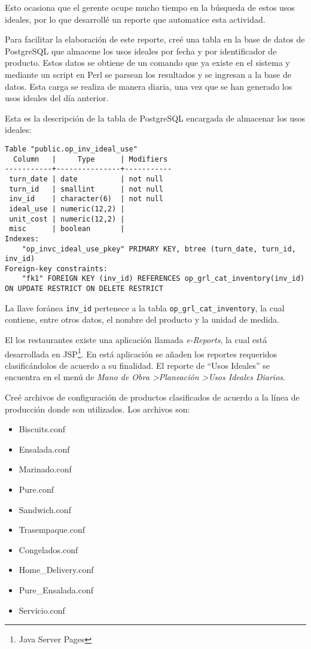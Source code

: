 Esto ocasiona que el gerente ocupe mucho tiempo en la búsqueda de estos usos ideales, por lo que desarrollé un reporte que automatice esta actividad.

Para facilitar la elaboración de este reporte, creé una tabla en la base de datos de PostgreSQL que almacene los usos ideales por fecha y por identificador de producto. Estos datos se obtiene de un comando que ya existe en el sistema y mediante un script en Perl se parsean los resultados y se ingresan a la base de datos. Esta carga se realiza de manera diaria, una vez que se han generado los usos ideales del día anterior. 

Esta es la descripción de la tabla de PostgreSQL encargada de almacenar los usos ideales:

\begin{Verbatim}[fontsize=\tiny]
    Table "public.op_inv_ideal_use"
  Column   |     Type      | Modifiers 
-----------+---------------+-----------
 turn_date | date          | not null
 turn_id   | smallint      | not null
 inv_id    | character(6)  | not null
 ideal_use | numeric(12,2) | 
 unit_cost | numeric(12,2) | 
 misc      | boolean       | 
Indexes:
    "op_invc_ideal_use_pkey" PRIMARY KEY, btree (turn_date, turn_id, inv_id)
Foreign-key constraints:
    "fk1" FOREIGN KEY (inv_id) REFERENCES op_grl_cat_inventory(inv_id) ON UPDATE RESTRICT ON DELETE RESTRICT
\end{Verbatim}

La llave foránea \texttt{inv\_id} pertenece a la tabla \texttt{op\_grl\_cat\_inventory}, la cual contiene, entre otros datos, el nombre del producto y la unidad de medida.

El los restaurantes existe una aplicación llamada \textit{e-Reports}\pageref{sec:ereports}, la cual está desarrollada en JSP\footnote{Java Server Pages}. En está aplicación se añaden los reportes requeridos clasificándolos de acuerdo a su finalidad. El reporte de ``Usos Ideales'' se  encuentra en el menú de \textit{Mano de Obra \textendash\textgreater Planeación \textendash\textgreater Usos Ideales Diarios}.

Creé archivos de configuración de productos clasificados de acuerdo a la línea de producción donde son utilizados. Los archivos son:

\begin{itemize}
 \item Biscuits.conf
 \item Ensalada.conf
 \item Marinado.conf
 \item Pure.conf
 \item Sandwich.conf
 \item Trasempaque.conf
 \item Congelados.conf  
 \item Home\_Delivery.conf
 \item Pure\_Ensalada.conf  
 \item Servicio.conf
\end{itemize}

